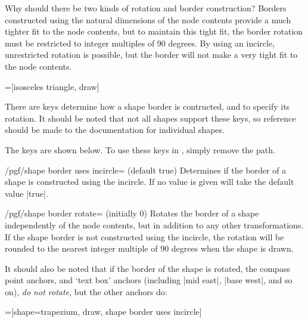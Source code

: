 Why should there be two kinds of rotation and border construction?
Borders constructed using the natural dimensions of the node contents
provide a much tighter fit to the node contents, but to maintain 
this tight fit, the border rotation must be restricted to integer 
multiples of 90 degrees. 
By using an incircle, unrestricted rotation is possible, but the 
border will not make a very tight fit to the node contents.
	
\begin{codeexample}[]
=[isosceles triangle, draw]
\end{codeexample}

There are \pgfname{} keys determine how a shape border is 
contructed, and to specify its rotation.
It should be noted that not all shapes support these keys, so 
reference should be made to the documentation for individual 
shapes. 
	
The \pgfname{} keys are shown below. To use these keys in \tikzname,
simply remove the  path.

\begin{key}{/pgf/shape border uses incircle= (default true)}
   Determines if the border of a shape is constructed using the 
   incircle. If no value is given  will take the default
   value |true|.
\end{key}


\begin{key}{/pgf/shape border rotate= (initially 0)}
   Rotates the border of a shape independently of the node contents,
   but in addition to any other transformations. If the shape 
   border is not constructed using the incircle, the rotation will be
   rounded to the nearest integer multiple of 90 degrees when the
   shape is drawn. 
\end{key}

It should also be noted that if the border of the shape is rotated, 
the compass point anchors, and `text box' anchors (including 
|mid east|, |base west|, and so on), \emph{do not rotate}, but the 
other anchors do:
	
\begin{codeexample}[]
=[shape=trapezium, draw, shape border uses incircle]
\end{codeexample}


